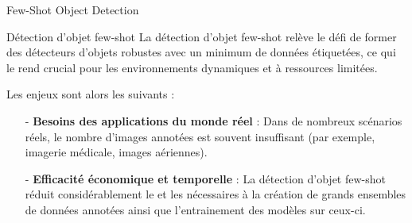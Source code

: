 \begin{subsectionframemod}{Few-Shot Object Detection}

    \vspace{-10mm}
    \begin{alertblock}{Détection d'objet few-shot}
        La détection d'objet few-shot relève le défi de former des détecteurs d'objets robustes avec un minimum de données étiquetées, ce qui le rend crucial pour les environnements dynamiques et à ressources limitées.
    \end{alertblock}

    Les enjeux sont alors les suivants :
    \begin{itemize}
        \item[-] \textbf{Besoins des applications du monde réel} : Dans de nombreux scénarios réels, le nombre d'images annotées est souvent insuffisant (par exemple, imagerie médicale, images aériennes).
        \item[-] \textbf{Efficacité économique et temporelle} : La détection d'objet few-shot réduit considérablement le  et les  nécessaires à la création de grands ensembles de données annotées ainsi que l'entrainement des modèles sur ceux-ci.
    \end{itemize}

\end{subsectionframemod}
